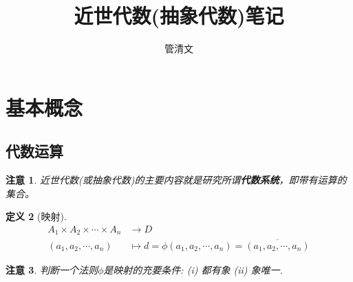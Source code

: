 \documentclass[UTF8]{ctexart}
\newtheorem{Definition}{定义}%
\newtheorem{Remark}[Definition]{注意}
\begin{document}
\title{近世代数(抽象代数)笔记}
\author{管清文}
\maketitle
\tableofcontents

\section{基本概念}

\subsection{代数运算}

\begin{Remark}
近世代数(或抽象代数)的主要内容就是研究所谓\textbf{代数系统}，即带有运算的集合。
\end{Remark}

\begin{Definition}[映射]
$$ \begin{aligned}
A_1 \times A_2 \times \cdots \times A_n &\rightarrow D \\
 (a_1, a_2, \cdots, a_n) &\mapsto d = \phi (a_1, a_2, \cdots, a_n) = \overline{(a_1, a_2, \cdots, a_n)} \end{aligned}$$ 
\end{Definition}

\begin{Remark}
 		判断一个法则$\phi$是映射的充要条件: (i) 都有象 (ii) 象唯一.
\end{Remark}
\end{document}
